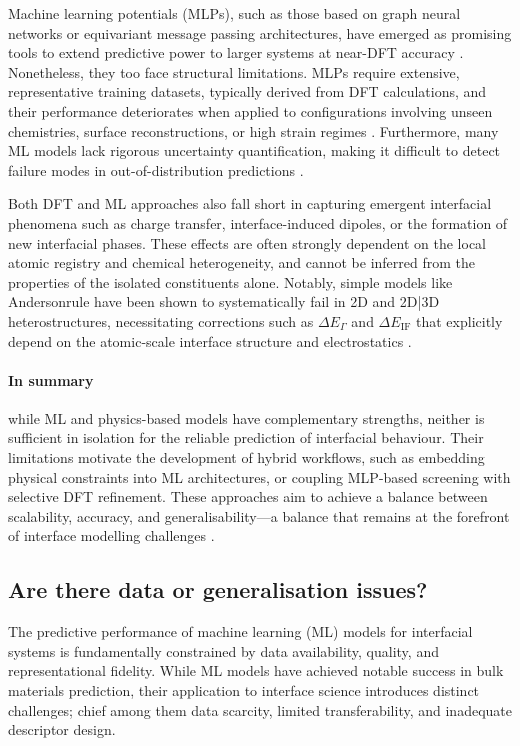 Machine learning potentials (MLPs), such as those based on graph neural networks or equivariant message passing architectures, have emerged as promising tools to extend predictive power to larger systems at near-DFT accuracy . Nonetheless, they too face structural limitations. MLPs require extensive, representative training datasets, typically derived from DFT calculations, and their performance deteriorates when applied to configurations involving unseen chemistries, surface reconstructions, or high strain regimes . Furthermore, many ML models lack rigorous uncertainty quantification, making it difficult to detect failure modes in out-of-distribution predictions .

Both DFT and ML approaches also fall short in capturing emergent interfacial phenomena such as charge transfer, interface-induced dipoles, or the formation of new interfacial phases. These effects are often strongly dependent on the local atomic registry and chemical heterogeneity, and cannot be inferred from the properties of the isolated constituents alone. Notably, simple models like Anderson\rqss rule have been shown to systematically fail in 2D and 2D|3D heterostructures, necessitating corrections such as $\Delta E_\Gamma$ and $\Delta E_\mathrm{IF}$ that explicitly depend on the atomic-scale interface structure and electrostatics .

\paragraph{In summary} while ML and physics-based models have complementary strengths, neither is sufficient in isolation for the reliable prediction of interfacial behaviour. Their limitations motivate the development of hybrid workflows, such as embedding physical constraints into ML architectures, or coupling MLP-based screening with selective DFT refinement. These approaches aim to achieve a balance between scalability, accuracy, and generalisability---a balance that remains at the forefront of interface modelling challenges .

\subsection{Are there data or generalisation issues?}

The predictive performance of machine learning (ML) models for interfacial systems is fundamentally constrained by data availability, quality, and representational fidelity. While ML models have achieved notable success in bulk materials prediction, their application to interface science introduces distinct challenges; chief among them data scarcity, limited transferability, and inadequate descriptor design.

